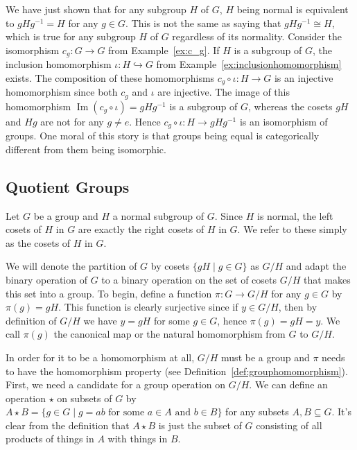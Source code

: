 \documentclass[12pt,letterpaper,DIV=11,final]{scrartcl}
\theoremstyle{plain}
\theoremstyle{definition}
\theoremstyle{remark}
\DeclareMathOperator{\ima}{Im}
\begin{document}
We have just shown that for any subgroup $H$ of $G$, $H$ being normal is equivalent to $g H g^{-1} = H$ for any $g \in G$.
This is not the same as saying that $g H g^{-1} \cong H$, which is true for any subgroup $H$ of $G$ regardless of its normality.
Consider the isomorphism $c_g : G \to G$ from Example~\ref{ex:c_g}.
If $H$ is a subgroup of $G$, the inclusion homomorphism $\iota : H \hookrightarrow G$ from Example~\ref{ex:inclusionhomomorphism} exists.
The composition of these homomorphisms $c_g \circ \iota : H \to G$ is an injective homomorphism since both $c_g$ and $\iota$ are injective.
The image of this homomorphism $\ima( c_g \circ \iota ) = g H g^{-1}$ is a subgroup of $G$, whereas the cosets $gH$ and $Hg$ are not for any $g \neq e$.
Hence $c_g \circ \iota : H \to g H g^{-1}$ is an isomorphism of groups.
One moral of this story is that groups being equal is categorically different from them being isomorphic.

\subsection{Quotient Groups}

Let $G$ be a group and $H$ a normal subgroup of $G$.
Since $H$ is normal, the left cosets of $H$ in $G$ are exactly the right cosets of $H$ in $G$.
We refer to these simply as the cosets of $H$ in $G$.

We will denote the partition of $G$ by cosets $\{ g H \mid g \in G \}$ as $G/H$ and adapt the binary operation of $G$ to a binary operation on the set of cosets $G/H$ that makes this set into a group.
To begin, define a function $\pi : G \to G/H$ for any $g \in G$ by $\pi(g) = g H$.
This function is clearly surjective since if $y \in G/H$, then by definition of $G/H$ we have $y = g H$ for some $g \in G$, hence $\pi(g) = g H = y$.
We call $\pi(g)$ the canonical map or the natural homomorphism from $G$ to $G/H$.

In order for it to be a homomorphism at all, $G/H$ must be a group and $\pi$ needs to have the homomorphism property (see Definition~\ref{def:grouphomomorphism}).
First, we need a candidate for a group operation on $G/H$.
We can define an operation $\star$ on subsets of $G$ by $A \star B = \{ g \in G \mid g = a b \text{ for some } a \in A \text{ and } b \in B \}$ for any subsets $A, B \subseteq G$.
It's clear from the definition that $A \star B$ is just the subset of $G$ consisting of all products of things in $A$ with things in $B$.
\end{document}
